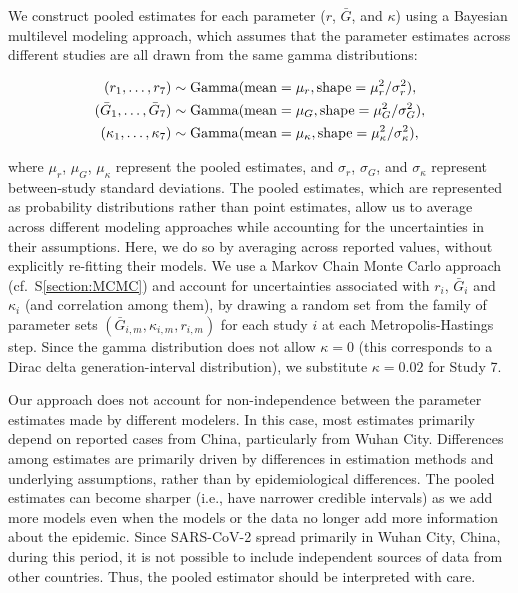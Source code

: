 \documentclass[12pt]{article}
\begin{document}
We construct pooled estimates for each parameter ($r$, $\bar G$, and $\kappa$) using a Bayesian multilevel modeling approach, which assumes that the parameter estimates across different studies are all drawn from the same gamma distributions:
\begin{linenomath*}
\begin{equation}
\begin{aligned}
(r_1, \dots, r_7) &\sim \mathrm{Gamma}(\mathrm{mean}=\mu_r, \mathrm{shape}=\mu_r^2/\sigma_r^2),\\
(\bar{G}_1, \dots, \bar{G}_7) &\sim \mathrm{Gamma}(\mathrm{mean}=\mu_G, \mathrm{shape}=\mu_G^2/\sigma_G^2),\\
(\kappa_1, \dots, \kappa_7) &\sim \mathrm{Gamma}(\mathrm{mean}=\mu_\kappa, \mathrm{shape}=\mu_\kappa^2/\sigma_\kappa^2),\\
\end{aligned}
\end{equation}
\end{linenomath*}
where $\mu_r$, $\mu_G$, $\mu_\kappa$ represent the pooled estimates, and $\sigma_r$, $\sigma_G$, and $\sigma_\kappa$ represent between-study standard deviations.
The pooled estimates, which are represented as probability distributions rather than point estimates, allow us to average across different modeling approaches while accounting for the uncertainties in their assumptions.
Here, we do so by averaging across reported values, without explicitly re-fitting their models.
We use a Markov Chain Monte Carlo approach (cf.~S\ref{section:MCMC}) and account for uncertainties associated with $r_i$, $\bar G_i$ and $\kappa_i$ (and correlation among them), by drawing a random set from the family of parameter sets $(\bar{G}_{i,m}, \kappa_{i,m}, r_{i,m})$ for each study $i$ at each Metropolis-Hastings step.
Since the gamma distribution does not allow $\kappa=0$ (this corresponds to a Dirac delta generation-interval distribution), we substitute $\kappa=0.02$ for Study 7.

Our approach does not account for non-independence between the parameter estimates made by different modelers.
In this case, most estimates primarily depend on reported cases from China, particularly from Wuhan City.
Differences among estimates are primarily driven by differences in estimation methods and underlying assumptions, rather than by epidemiological differences.
The pooled estimates can become sharper (i.e., have narrower credible intervals) as we add more models even when the models or the data no longer add more information about the epidemic.
Since SARS-CoV-2 spread primarily in Wuhan City, China, during this period, it is not possible to include independent sources of data from other countries.
Thus, the pooled estimator should be interpreted with care.
\end{document}
